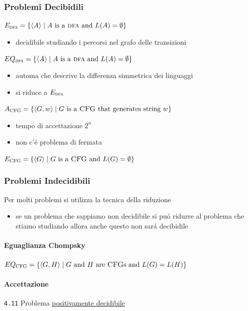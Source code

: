 \documentclass[
                        12pt, %
                        a4paper, %
                        oneside, %
                        headinclude,footinclude, %
                        BCOR5mm, %
                  ]{scrartcl}
\begin{document}
\subsubsection{Problemi Decibidili}
\label{sec:org53abc93}
\(E_{\textsc{dfa}} = \{\langle A \rangle \mid A\mbox{ is a \textsc{dfa} and } L(A)=\emptyset \}\)
\begin{itemize}
\item decidibile studiando i percorsi nel grafo delle transizioni
\end{itemize}
\(EQ_{\textsc{dfa}} = \{\langle A \rangle\mid A\mbox{ is a \textsc{dfa} and } L(A)=\emptyset\}\)
\begin{itemize}
\item automa che descrive la differenza simmetrica dei linguaggi
\item si riduce a \(E_{\textsc{dfa}}\)
\end{itemize}
\(A_{\textsc{CFG}}=\{\langle G,w \rangle \mid G\mbox{ is a \textsc{CFG} that generates string }w\}\)
\begin{itemize}
\item tempo di accettazione \(2^n\)
\item non c'é problema di fermata
\end{itemize}
\(E_{\textsc{CFG}}=\{\langle G \rangle \mid G\mbox{ is a \textsc{CFG} and }L(G) = \emptyset\}\)

\subsubsection{Problemi Indecidibili}
\label{sec:orgf64b7f7}
Per molti problemi si utilizza la tecnica della riduzione
\begin{itemize}
\item se un problema che sappiamo non decidibile si puó ridurre al problema che stiamo studiando allora anche questo non sará decibidile
\end{itemize}
\paragraph{Eguaglianza Chompsky}
\label{sec:orgb55df7f}
\(EQ_{\textsc{CFG}}=\{\langle G,H \rangle \mid G\mbox{ and }H\mbox{ are \textsc{CFG}s and }L(G) = L(H)\}\)
\paragraph{Accettazione}
\label{sec:org8c88fe6}
\texttt{4.11}
Problema \uline{positivamente decidibile}
\end{document}
